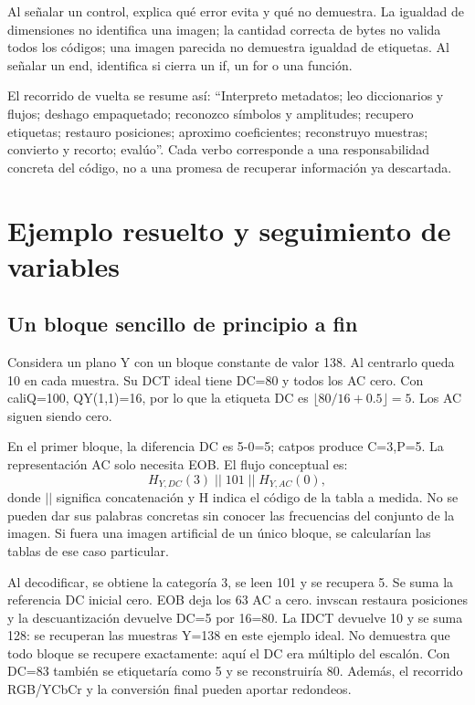 \documentclass[11pt,a4paper,oneside]{report}
\begin{document}
Al señalar un control, explica qué error evita y qué no demuestra. La igualdad
de dimensiones no identifica una imagen; la cantidad correcta de bytes no
valida todos los códigos; una imagen parecida no demuestra igualdad de etiquetas.
Al señalar un end, identifica si cierra un if, un for o una función.

El recorrido de vuelta se resume así: ``Interpreto metadatos; leo diccionarios
y flujos; deshago empaquetado; reconozco símbolos y amplitudes; recupero
etiquetas; restauro posiciones; aproximo coeficientes; reconstruyo muestras;
convierto y recorto; evalúo''. Cada verbo corresponde a una responsabilidad
concreta del código, no a una promesa de recuperar información ya descartada.


\chapter{Ejemplo resuelto y seguimiento de variables}
\section{Un bloque sencillo de principio a fin}

Considera un plano Y con un bloque constante de valor 138. Al centrarlo queda
10 en cada muestra. Su DCT ideal tiene DC=80 y todos los AC cero.
Con caliQ=100, QY(1,1)=16, por lo que la etiqueta DC es
$\lfloor80/16+0.5\rfloor=5$. Los AC siguen siendo cero.

En el primer bloque, la diferencia DC es 5-0=5; catpos produce C=3,P=5.
La representación AC solo necesita EOB. El flujo conceptual es:
\[
H_{Y,DC}(3)\;||\;101\;||\;H_{Y,AC}(0),
\]
donde $||$ significa concatenación y H indica el código de la tabla a medida.
No se pueden dar sus palabras concretas sin conocer las frecuencias del conjunto
de la imagen. Si fuera una imagen artificial de un único bloque, se calcularían
las tablas de ese caso particular.

Al decodificar, se obtiene la categoría 3, se leen 101 y se recupera 5.
Se suma la referencia DC inicial cero. EOB deja los 63 AC a cero. invscan
restaura posiciones y la descuantización devuelve DC=5 por 16=80.
La IDCT devuelve 10 y se suma 128: se recuperan las muestras Y=138 en este
ejemplo ideal. No demuestra que todo bloque se recupere exactamente: aquí
el DC era múltiplo del escalón. Con DC=83 también se etiquetaría como 5
y se reconstruiría 80. Además, el recorrido RGB/YCbCr y la conversión final
pueden aportar redondeos.
\end{document}
